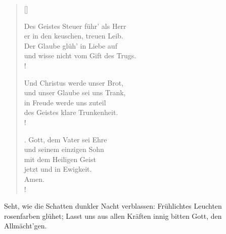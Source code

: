 \begin{multicols}{2}
\begin{verse}[\versewidth]
{{ Des Geistes Steuer führ’ als Herr\\
er in den keuschen, treuen Leib.\\
Der Glaube glüh’ in Liebe auf\\
und wisse nicht vom Gift des Trugs.\\!

 Und Christus werde unser Brot,\\
und unser Glaube sei uns Trank,\\
in Freude werde uns zuteil\\
des Geistes klare Trunkenheit.\\!

. Gott, dem Vater sei Ehre\\
und seinem einzigen Sohn\\
mit dem Heiligen Geist\\
jetzt und in Ewigkeit.\\
Amen.\\!}}
\end{verse}

\end{multicols}

\medskip

\def\greinitialformat#1{{\fontsize{40}{40}\selectfont #1}}
\gresetfirstlineaboveinitial{\small \textcolor{red}{æstate}}{}
\setaboveinitialseparation{0.72mm}

\medskip

\begin{sloppypar}
{\noindent\rm{ Seht, wie die Schatten
dunkler Nacht verblassen: Früh\-lichtes Leuchten
rosenfarben glühet; Lasst uns aus allen Kräften
innig bitten Gott, den Allmächt’gen.}}
\end{sloppypar}

